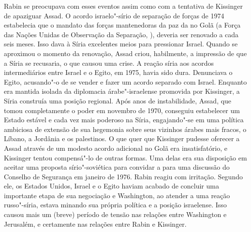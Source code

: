 Rabin se preocupava com esses eventos assim como com a tentativa de
Kissinger de apaziguar Assad. O acordo israelo"-sírio de separação de
forças de 1974 estabelecia que o mandato das forças mantenedoras da paz
da  no Golã (a Força das Nações Unidas de Observação da Separação, ), deveria ser renovado a cada seis meses. Isso
dava à Síria excelentes meios para pressionar Israel. Quando se
aproximou o momento da renovação, Assad criou, habilmente, a impressão
de que a Síria se recusaria, o que causou uma crise. A reação síria
aos acordos intermediários entre Israel e o Egito, em 1975, havia sido
dura. Denunciava o Egito, acusando"-o de se vender e fazer um acordo
separado com Israel. Enquanto era mantida isolada da diplomacia
árabe"-israelense promovida por Kissinger, a Síria construía uma posição
regional. Após anos de instabilidade, Assad, que tomou completamente o
poder em novembro de 1970, conseguiu estabelecer um Estado estável e
cada vez mais poderoso na Síria, engajando"-se em uma política ambiciosa
de extensão de sua hegemonia sobre seus vizinhos árabes mais fracos, o
Líbano, a Jordânia e os palestinos. O que quer que Kissinger pudesse
oferecer a Assad através de um modesto acordo adicional no Golã era
insatisfatório, e Kissinger tentou compensá"-lo de outras formas. Uma
delas era sua disposição em aceitar uma proposta sírio"-soviética para
convidar a  para uma discussão do Conselho de Segurança em janeiro de
1976. Rabin reagiu com irritação. Segundo ele, os Estados Unidos, Israel
e o Egito haviam acabado de concluir uma importante etapa de sua
negociação e Washington, ao atender a uma reação russo"-síria, estava
minando sua própria política e a posição israelense. Isso causou mais um
(breve) período de tensão nas relações entre Washington e Jerusalém, e
certamente nas relações entre Rabin e Kissinger.

